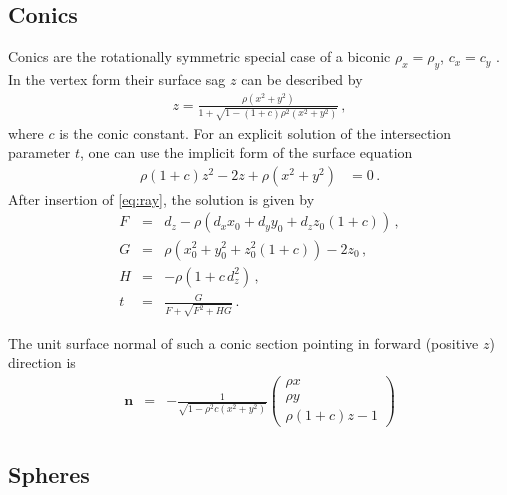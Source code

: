 \documentclass[12pt,a4paper,twoside,openright,BCOR10mm,headsepline,titlepage,abstracton,chapterprefix,final]{scrreprt}
\newcommand\Vector[1]{{\mathbf{#1}}}
\begin{document}
\subsection{Conics}
Conics are the rotationally symmetric special case of a biconic $\rho_x = \rho_y$, $c_x = c_y$ .
In the vertex form their surface sag $z$ can be described by
\begin{eqnarray}
 z =  \frac
 { \rho ( x^2 + y^2 ) }
 { 1 + \sqrt{1 - (1+c) \rho^2  (x^2 + y^2)} }\,,
\end{eqnarray}
where $c$ is the conic constant. 
For an explicit solution of the intersection parameter $t$,
one can use the implicit form of the surface equation
\begin{align}
 \rho (1 + c) z^2 - 2 z + \rho (x^2 + y^2) &=0\,.
\end{align}
After insertion of \eqref{eq:ray}, the solution is given by
\begin{subequations}
\label{eq:intersectionconicsection}
\begin{eqnarray}
   F &=& d_z - \rho \left( d_x x_0 + d_y y_0 + d_z z_0 (1+c) \right)\,, \\
   G &=& \rho (x_0^2 + y_0^2 + z_0^2 (1+c)) - 2 z_0\,, \\
   H &=& - \rho ( 1 + c \, d_z^2 )\,, \\
   t &=& \frac{G}{ F + \sqrt{F^2 + H G} }\,.
\end{eqnarray}
\end{subequations}

The unit surface normal of such a conic section pointing in forward (positive $z$) direction is
\begin{eqnarray}
\Vector{n} &=& - \frac{1}{\sqrt{ 1 - \rho^2 c (x^2 + y^2)}} 
  \begin{pmatrix}
   \rho x \\
   \rho y \\
   \rho ( 1 + c ) z - 1
  \end{pmatrix}
\end{eqnarray}




\subsection{Spheres}
\label{subsection:spheres}
\end{document}
